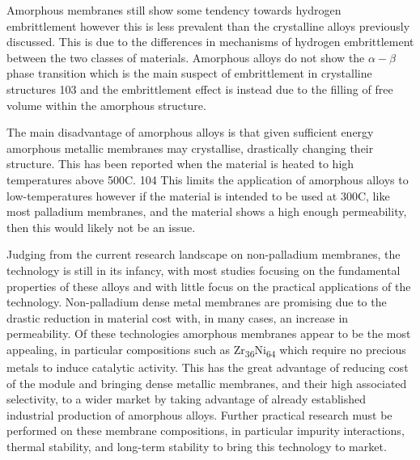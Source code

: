  Amorphous membranes still show some tendency towards hydrogen embrittlement however this is 
 less prevalent than the crystalline alloys previously discussed. This is due to the 
 differences in mechanisms of hydrogen embrittlement between the two classes of materials. 
 Amorphous alloys do not show the $\alpha - \beta$ phase transition which is the main suspect of 
 embrittlement in crystalline structures 103 and the embrittlement effect is instead due to 
 the filling of free volume within the amorphous structure.
 
 
 The main disadvantage of amorphous alloys is that given sufficient energy amorphous metallic 
 membranes may crystallise, drastically changing their structure. This has been reported when 
 the material is heated to high temperatures above 500\textdegree C. 104 This limits the application of 
 amorphous alloys to low-temperatures however if the material is intended to be used at 300\textdegree C, 
 like most palladium membranes, and the material shows a high enough permeability, then this 
 would likely not be an issue. 

Judging from the current research landscape on non-palladium membranes, the technology is 
still in its infancy, with most studies focusing on the fundamental properties of these alloys 
and with little focus on the practical applications of the technology.  Non-palladium dense 
metal membranes are promising due to the drastic reduction in material cost with, in many 
cases, an increase in permeability. Of these technologies amorphous membranes appear to be 
the most appealing, in particular compositions such as Zr\textsubscript{36}Ni\textsubscript{64} which require no precious 
metals to induce catalytic activity. This has the great advantage of reducing cost of the 
module and bringing dense metallic membranes, and their high associated selectivity, to a 
wider market by taking advantage of already established industrial production of amorphous
alloys. Further practical research must be performed on these membrane compositions, in 
particular impurity interactions, thermal stability, and long-term stability to bring this 
technology to market.  

